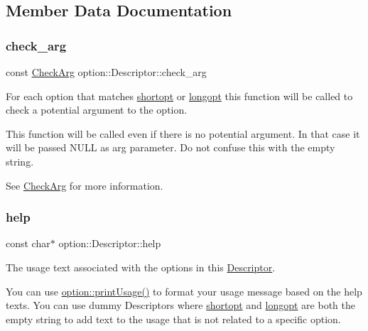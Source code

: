 \subsection{Member Data Documentation}
\mbox{\label{structoption_1_1Descriptor_aa5d675dba0214a4abd73007ff163cc67}} 
\subsubsection{\texorpdfstring{check\+\_\+arg}{check\_arg}}
{\footnotesize\ttfamily const \hyperlink{namespaceoption_a4cdf403efae65e18bf850e2001b12a2a}{Check\+Arg} option\+::\+Descriptor\+::check\+\_\+arg}



For each option that matches \hyperlink{structoption_1_1Descriptor_a0dba4ccca59c19d6ed4081391fca5adb}{shortopt} or \hyperlink{structoption_1_1Descriptor_a470c449dfa894c9bfda2dae026142b4b}{longopt} this function will be called to check a potential argument to the option. 

This function will be called even if there is no potential argument. In that case it will be passed {\ttfamily N\+U\+LL} as {\ttfamily arg} parameter. Do not confuse this with the empty string.

See \hyperlink{namespaceoption_a4cdf403efae65e18bf850e2001b12a2a}{Check\+Arg} for more information. \mbox{\label{structoption_1_1Descriptor_a9045b19311533e1b8a08645d57149c79}} 
\subsubsection{\texorpdfstring{help}{help}}
{\footnotesize\ttfamily const char$\ast$ option\+::\+Descriptor\+::help}



The usage text associated with the options in this \hyperlink{structoption_1_1Descriptor}{Descriptor}. 

You can use \hyperlink{namespaceoption_afc8bb7e040a98a0b33ff1ce9da1be0d1}{option\+::print\+Usage()} to format your usage message based on the {\ttfamily help} texts. You can use dummy Descriptors where \hyperlink{structoption_1_1Descriptor_a0dba4ccca59c19d6ed4081391fca5adb}{shortopt} and \hyperlink{structoption_1_1Descriptor_a470c449dfa894c9bfda2dae026142b4b}{longopt} are both the empty string to add text to the usage that is not related to a specific option.

